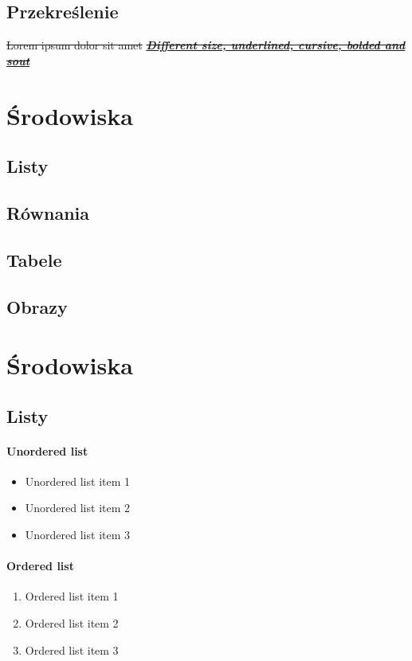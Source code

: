 \documentclass{article}
\begin{document}
\subsection{Przekreślenie}
\sout{Lorem ipsum dolor sit amet}
\newline
\textbf{\underline{\textit{\sout{{\LARGE Different size, underlined, cursive, bolded and sout}}}}}
\section{Środowiska}
\subsection{Listy}
\subsection{Równania}
\subsection{Tabele}
\subsection{Obrazy}


\section{Środowiska}
\subsection{Listy}
\paragraph{Unordered list}
\begin{itemize}
    \item Unordered list item 1
    \item Unordered list item 2
    \item Unordered list item 3
 \end{itemize}
 
 \paragraph{Ordered list}
 \begin{enumerate}
    \item Ordered list item 1
    \item Ordered list item 2
    \item Ordered list item 3
 \end{enumerate}
 
\end{document}
